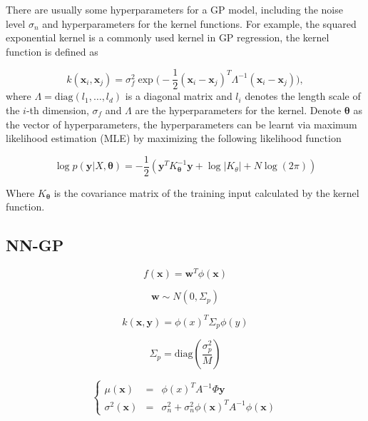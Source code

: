 There are usually some hyperparameters for a GP model, including the noise level $\sigma_n$ and hyperparameters for the kernel functions. For example, the squared exponential kernel is a commonly used kernel in GP regression, the kernel function is defined as

\begin{equation}
    \label{eq:GaussianCovarianceFunction}
    k(\bm{x}_i, \bm{x}_j) = \sigma_f^2 \exp\Big(-\frac{1}{2}(\bm{x}_i - \bm{x}_j)^T\Lambda^{-1}(\bm{x}_i - \bm{x}_j)\Big),
\end{equation}
where $\Lambda = \mathrm{diag}(l_1, \dots, l_d)$ is a diagonal matrix and $l_i$ denotes the length scale of the $i$-th dimension, $\sigma_f$ and $\Lambda$ are the hyperparameters for the kernel. Denote $\bm{\theta}$ as the vector of hyperparameters, the hyperparameters can be learnt via maximum likelihood estimation (MLE) by maximizing the following likelihood function

\begin{equation}
    \log p(\bm{y} | X, \bm{\theta}) = -\frac{1}{2}(\bm{y}^T K_{\bm{\theta}}^{-1} \bm{y} + \log |K_{\theta}| + N \log(2 \pi))
\end{equation}

Where $K_{\bm{\theta}}$ is the covariance matrix of the training input calculated by the kernel function. 

\subsection{NN-GP}


\begin{equation}
    f(\bm{x}) = \bm{w}^T \phi(\bm{x})
\end{equation}

\begin{equation}
    \bm{w} \sim N(0, \Sigma_p)
\end{equation}

\begin{equation}
    k(\bm{x}, \bm{y}) = \phi(x)^T \Sigma_p \phi(y)
\end{equation}

\begin{equation}
    \Sigma_p = \mathrm{diag}(\frac{\sigma_p^2}{M})
\end{equation}

\begin{equation}
    \left\{
        \begin{array}{lll}
            \mu(\bm{x})      &=& \phi(x)^T A^{-1} \Phi \bm{y} \\
            \sigma^2(\bm{x}) &=& \sigma_n^2 + \sigma_n^2 \phi(\bm{x})^T A^{-1} \phi(\bm{x})
        \end{array}
    \right.
\end{equation}

